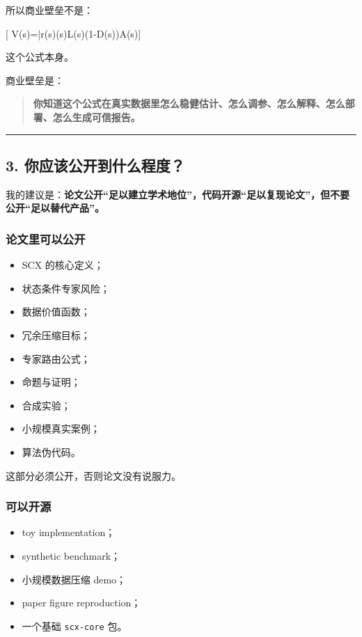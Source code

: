 \documentclass[
  12pt,
]{ctexart}
\providecommand{\tightlist}{%
  \setlength{\itemsep}{0pt}\setlength{\parskip}{0pt}}
\begin{document}
所以商业壁垒不是：

{[} V(s)=\bar r(s)\rho(s)L(s)(1-D(s))A(s){]}

这个公式本身。

商业壁垒是：

\begin{quote}
\textbf{你知道这个公式在真实数据里怎么稳健估计、怎么调参、怎么解释、怎么部署、怎么生成可信报告。}
\end{quote}

\begin{center}\rule{0.5\linewidth}{0.5pt}\end{center}

\subsection{3.
你应该公开到什么程度？}\label{ux4f60ux5e94ux8be5ux516cux5f00ux5230ux4ec0ux4e48ux7a0bux5ea6}

我的建议是：\textbf{论文公开``足以建立学术地位''，代码开源``足以复现论文''，但不要公开``足以替代产品''。}

\subsubsection{论文里可以公开}\label{ux8bbaux6587ux91ccux53efux4ee5ux516cux5f00}

\begin{itemize}
\tightlist
\item
  SCX 的核心定义；
\item
  状态条件专家风险；
\item
  数据价值函数；
\item
  冗余压缩目标；
\item
  专家路由公式；
\item
  命题与证明；
\item
  合成实验；
\item
  小规模真实案例；
\item
  算法伪代码。
\end{itemize}

这部分必须公开，否则论文没有说服力。

\subsubsection{可以开源}\label{ux53efux4ee5ux5f00ux6e90}

\begin{itemize}
\tightlist
\item
  toy implementation；
\item
  synthetic benchmark；
\item
  小规模数据压缩 demo；
\item
  paper figure reproduction；
\item
  一个基础 \texttt{scx-core} 包。
\end{itemize}
\end{document}
